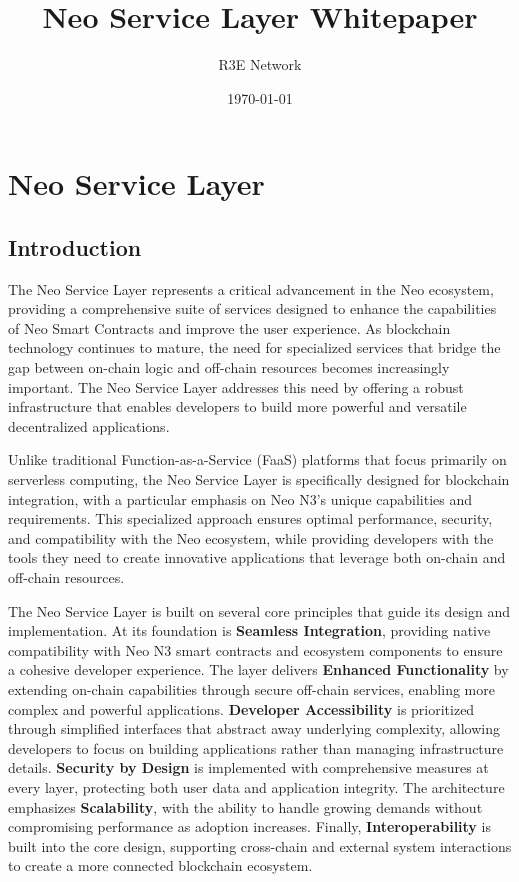 \documentclass[12pt,a4paper]{article}
\title{Neo Service Layer Whitepaper}
\author{R3E Network}
\date{\today}
\begin{document}
\maketitle
\tableofcontents
\newpage

\section{Neo Service Layer}
\label{sec:neo-service-layer}

\subsection{Introduction}
\label{subsec:nsl-intro}

The Neo Service Layer represents a critical advancement in the Neo ecosystem, providing a comprehensive suite of services designed to enhance the capabilities of Neo Smart Contracts and improve the user experience. As blockchain technology continues to mature, the need for specialized services that bridge the gap between on-chain logic and off-chain resources becomes increasingly important. The Neo Service Layer addresses this need by offering a robust infrastructure that enables developers to build more powerful and versatile decentralized applications.

Unlike traditional Function-as-a-Service (FaaS) platforms that focus primarily on serverless computing, the Neo Service Layer is specifically designed for blockchain integration, with a particular emphasis on Neo N3's unique capabilities and requirements. This specialized approach ensures optimal performance, security, and compatibility with the Neo ecosystem, while providing developers with the tools they need to create innovative applications that leverage both on-chain and off-chain resources.

The Neo Service Layer is built on several core principles that guide its design and implementation. At its foundation is \textbf{Seamless Integration}, providing native compatibility with Neo N3 smart contracts and ecosystem components to ensure a cohesive developer experience. The layer delivers \textbf{Enhanced Functionality} by extending on-chain capabilities through secure off-chain services, enabling more complex and powerful applications. \textbf{Developer Accessibility} is prioritized through simplified interfaces that abstract away underlying complexity, allowing developers to focus on building applications rather than managing infrastructure details. \textbf{Security by Design} is implemented with comprehensive measures at every layer, protecting both user data and application integrity. The architecture emphasizes \textbf{Scalability}, with the ability to handle growing demands without compromising performance as adoption increases. Finally, \textbf{Interoperability} is built into the core design, supporting cross-chain and external system interactions to create a more connected blockchain ecosystem.
\end{document}
